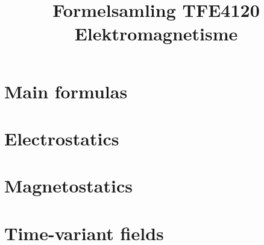 

\title{Formelsamling TFE4120 Elektromagnetisme}





    

    \section{Main formulas}
    

    \section{Electrostatics}
    

    \section{Magnetostatics}
    

    \section{Time-variant fields}
    

